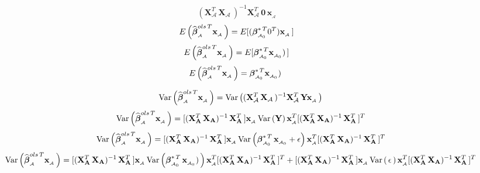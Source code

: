 \documentclass[11pt]{report}
\newcommand{\bfmath}[1]{\mbox{\boldmath$#1$\unboldmath}}
\begin{document}
\begin{enumerate}
$$ \left(\mathbf{X}_{\mathcal{A}}^{T}\,\mathbf{X}_{\mathcal{A}}\,\right)^{-1}\mathbf{X}_{\mathcal{A}}^{T}\,\mathbf{0}\,\mathbf{x}_{_\mathcal{A}}$$
$$E\left( \widehat{\bfmath{\beta}}^{ols\,T}_{_\mathcal{A}}\mathbf{x}_{_\mathcal{A}}\,\right)= E\lbrack(\bfmath{\beta}^{\ast\,T}_{_{\mathcal{A}_0}}  0^{T})\mathbf{x}_{_\mathcal{A}}\,\rbrack$$
$$E\left( \widehat{\bfmath{\beta}}^{ols\,T}_{_\mathcal{A}}\mathbf{x}_{_\mathcal{A}}\,\right)= E\lbrack\bfmath{\beta}^{\ast\,T}_{_{\mathcal{A}_0}}\mathbf{x}_{_{\mathcal{A}_0}})\,\rbrack$$
$$E\left( \widehat{\bfmath{\beta}}^{ols\,T}_{_\mathcal{A}}\mathbf{x}_{_\mathcal{A}}\,\right)= \bfmath{\beta}^{\ast\,T}_{_{\mathcal{A}_0}}\mathbf{x}_{_{\mathcal{A}_0}})\,\,$$


$$\quad \text{Var}\left( \widehat{\bfmath{\beta}}^{ols\,T}_{_\mathcal{A}}\mathbf{x}_{_\mathcal{A}}\,\right)= \text{Var}\left( (\mathbf{X}_{\mathcal{A}}^{T}\,\mathbf{X}_{\mathcal{A}}\,)^{-1}\mathbf{X}_{\mathcal{A}}^{T}\,\mathbf{Y}\mathbf{x}_{_\mathcal{A}}\,\right)$$
$$ \quad \text{Var}\left( \widehat{\bfmath{\beta}}^{ols\,T}_{_\mathcal{A}}\mathbf{x}_{_\mathcal{A}}\,\right)= [(\mathbf{X}^{T}_{\mathbf{A}}\,\mathbf{X}_{\mathbf{A}})^{-1}\,\mathbf{X}^{T}_{\mathbf{A}}\,]\mathbf{x}_{_\mathcal{A}}\,\text{Var}\left( \mathbf{Y} \right)\mathbf{x}^{T}_{_\mathcal{A}}[(\mathbf{X}^{T}_{\mathbf{A}}\,\mathbf{X}_{\mathbf{A}})^{-1}\,\mathbf{X}^{T}_{\mathbf{A}}\,]^{T}$$
$$ \quad \text{Var}\left( \widehat{\bfmath{\beta}}^{ols\,T}_{_\mathcal{A}}\mathbf{x}_{_\mathcal{A}}\,\right)= [(\mathbf{X}^{T}_{\mathbf{A}}\,\mathbf{X}_{\mathbf{A}})^{-1}\,\mathbf{X}^{T}_{\mathbf{A}}\,]\mathbf{x}_{_\mathcal{A}}\,\text{Var}\left( \bfmath{\beta}^{\ast\,T}_{_{\mathcal{A}_0}}\,\mathbf{x}_{_{\mathcal{A}_0}} + \mathbf{\epsilon} \right)\mathbf{x}^{T}_{_\mathcal{A}}[(\mathbf{X}^{T}_{\mathbf{A}}\,\mathbf{X}_{\mathbf{A}})^{-1}\,\mathbf{X}^{T}_{\mathbf{A}}\,]^{T}$$
$$ \quad \text{Var}\left( \widehat{\bfmath{\beta}}^{ols\,T}_{_\mathcal{A}}\mathbf{x}_{_\mathcal{A}}\,\right)= [(\mathbf{X}^{T}_{\mathbf{A}}\,\mathbf{X}_{\mathbf{A}})^{-1}\,\mathbf{X}^{T}_{\mathbf{A}}\,]\mathbf{x}_{_\mathcal{A}}\,\text{Var}\left( \bfmath{\beta}^{\ast\,T}_{_{\mathcal{A}_0}}\,\mathbf{x}_{_{\mathcal{A}_0}})\,\right)\mathbf{x}^{T}_{_\mathcal{A}}[(\mathbf{X}^{T}_{\mathbf{A}}\,\mathbf{X}_{\mathbf{A}})^{-1}\,\mathbf{X}^{T}_{\mathbf{A}}\,]^{T} + [(\mathbf{X}^{T}_{\mathbf{A}}\,\mathbf{X}_{\mathbf{A}})^{-1}\,\mathbf{X}^{T}_{\mathbf{A}}\,]\mathbf{x}_{_\mathcal{A}}\,\text{Var}\left(\,\mathbf{\epsilon}\, \right)\mathbf{x}^{T}_{_\mathcal{A}}[(\mathbf{X}^{T}_{\mathbf{A}}\,\mathbf{X}_{\mathbf{A}})^{-1}\,\mathbf{X}^{T}_{\mathbf{A}}\,]^{T}$$

\end{enumerate}
\end{document}
